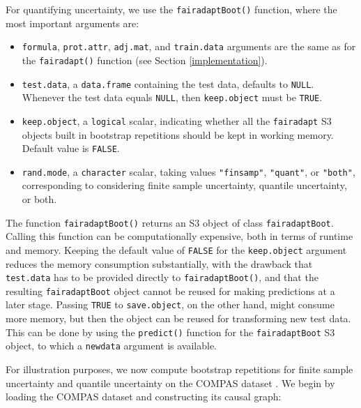 \documentclass[
  nojss]{jss}
\providecommand{\tightlist}{%
  \setlength{\itemsep}{0pt}\setlength{\parskip}{0pt}}
\begin{document}
For quantifying uncertainty, we use the \texttt{fairadaptBoot()}
function, where the most important arguments are:

\begin{itemize}
\tightlist
\item
  \texttt{formula}, \texttt{prot.attr}, \texttt{adj.mat}, and
  \texttt{train.data} arguments are the same as for the
  \texttt{fairadapt()} function (see Section \ref{implementation}).
\item
  \texttt{test.data}, a \texttt{data.frame} containing the test data,
  defaults to \texttt{NULL}. Whenever the test data equals
  \texttt{NULL}, then \texttt{keep.object} must be \texttt{TRUE}.
\item
  \texttt{keep.object}, a \texttt{logical} scalar, indicating whether
  all the \texttt{fairadapt} S3 objects built in bootstrap repetitions
  should be kept in working memory. Default value is \texttt{FALSE}.
\item
  \texttt{rand.mode}, a \texttt{character} scalar, taking values
  \texttt{"finsamp"}, \texttt{"quant"}, or \texttt{"both"},
  corresponding to considering finite sample uncertainty, quantile
  uncertainty, or both.
\end{itemize}

The function \texttt{fairadaptBoot()} returns an S3 object of class
\texttt{fairadaptBoot}. Calling this function can be computationally
expensive, both in terms of runtime and memory. Keeping the default
value of \texttt{FALSE} for the \texttt{keep.object} argument reduces
the memory consumption substantially, with the drawback that
\texttt{test.data} has to be provided directly to
\texttt{fairadaptBoot()}, and that the resulting \texttt{fairadaptBoot}
object cannot be reused for making predictions at a later stage. Passing
\texttt{TRUE} to \texttt{save.object}, on the other hand, might consume
more memory, but then the object can be reused for transforming new test
data. This can be done by using the \texttt{predict()} function for the
\texttt{fairadaptBoot} S3 object, to which a \texttt{newdata} argument
is available.

For illustration purposes, we now compute bootstrap repetitions for
finite sample uncertainty and quantile uncertainty on the COMPAS dataset
\citep{larson2016compas}. We begin by loading the COMPAS dataset and
constructing its causal graph:
\end{document}
